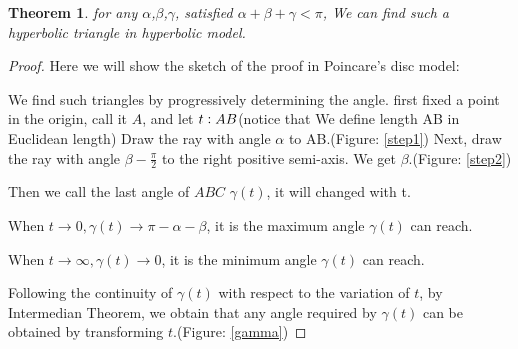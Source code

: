 \documentclass{article}
\newtheorem{Thm}{Theorem}[section]
\begin{document}
\begin{Thm}
    for any $\alpha$,$\beta$,$\gamma$, satisfied $\alpha+\beta+\gamma<\pi$,
    We can find such a hyperbolic triangle in hyperbolic model.
\end{Thm}
\begin{proof}
    Here we will show the sketch of the proof in Poincare's disc model:

    We find such triangles by progressively determining the angle.
    first fixed a point in the origin, call it $A$, and let $t \vcentcolon AB$(notice that We define length AB in Euclidean length)
    Draw the ray with angle $\alpha$ to AB.(Figure: \ref{step1})
    Next, draw the ray with angle $\beta-\frac{\pi}{2}$ to the right positive semi-axis. We get $\beta$.(Figure: \ref{step2})

    Then we call the last angle of $ABC$ $\gamma(t)$, it will changed with t.

    When $t\rightarrow 0,\gamma(t)\rightarrow \pi-\alpha-\beta$, it is the maximum angle $\gamma(t)$ can reach.

    When $t\rightarrow \infty,\gamma(t)\rightarrow 0$, it is the minimum angle $\gamma(t)$ can reach.

    Following the continuity of $\gamma(t)$ with respect to the variation of $t$, by Intermedian Theorem,
    we obtain that any angle required by $\gamma(t)$ can be obtained by transforming $t$.(Figure: \ref{gamma})
\end{proof}
\newpage
\end{document}
